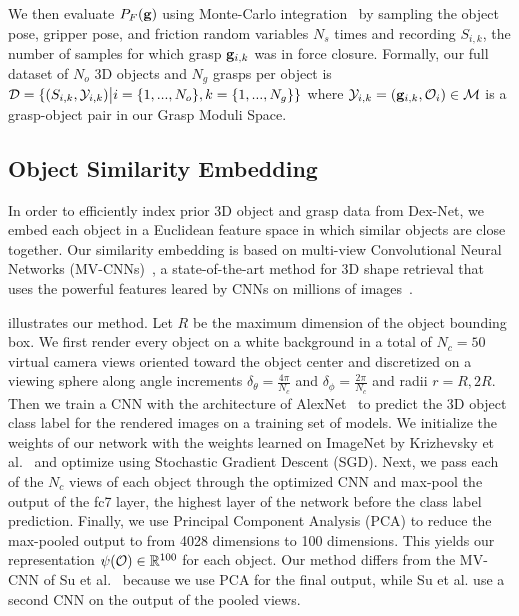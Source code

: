 We then evaluate $P_F(\mathbf{g})$ using Monte-Carlo integration~\cite{kehoe2012toward} by sampling the object pose, gripper pose, and friction random variables $N_s$ times and recording $S_{i,k}$, the number of samples for which grasp $\mathbf{g}_{i,k}$ was in force closure.
Formally, our full dataset of $N_o$ 3D objects and $N_g$ grasps per object is $\mathcal{D} = \{ (S_{i, k}, \mathcal{Y}_{i, k}) \big| i = \{1, ..., N_o\}, k = \{1, ..., N_g\} \}$ where $\mathcal{Y}_{i,k} = (\mathbf{g}_{i, k}, \mathcal{O}_i) \in \mathcal{M}$ is a grasp-object pair in our Grasp Moduli Space.



\subsection{Object Similarity Embedding}
In order to efficiently index prior 3D object and grasp data from Dex-Net, we embed each object in a Euclidean feature space in which similar objects are close together.
Our similarity embedding is based on multi-view Convolutional Neural Networks (MV-CNNs)~\cite{su2015multi}, a state-of-the-art method for 3D shape retrieval that uses the powerful features leared by CNNs on millions of images~\cite{krizhevsky2012imagenet}.
 
 illustrates our method.
Let $R$ be the maximum dimension of the object bounding box.
We first render every object on a white background in a total of $N_c = 50$ virtual camera views oriented toward the object center and discretized on a viewing sphere along angle increments $\delta_{\theta} = \frac{4 \pi}{N_c}$ and $\delta_{\phi} = \frac{2 \pi}{N_c}$ and radii $r = R, 2R$.
Then we train a CNN with the architecture of AlexNet~\cite{krizhevsky2012imagenet} to predict the 3D object class label for the rendered images on a training set of models. 
We initialize the weights of our network with the weights learned on ImageNet by Krizhevsky et al.~\cite{krizhevsky2012imagenet} and optimize using Stochastic Gradient Descent (SGD). 
Next, we pass each of the $N_c$ views of each object through the optimized CNN and max-pool the output of the fc7 layer, the highest layer of the network before the class label prediction. 
Finally, we use Principal Component Analysis (PCA) to reduce the max-pooled output to from 4028 dimensions to 100 dimensions.
This yields our representation $\psi(\mathcal{O}) \in \mathbb{R}^{100}$ for each object.
Our method differs from the MV-CNN of Su et al.~\cite{su2015multi} because we use PCA for the final output, while Su et al. use a second CNN on the output of the pooled views. 

